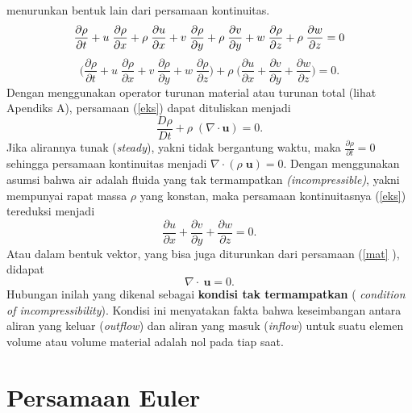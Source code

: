 \documentclass[12pt,a4paper]{report}
\begin{document}
menurunkan bentuk lain dari persamaan kontinuitas.
\begin{equation}
\frac{\partial \rho}{\partial t}+u\;\frac{\partial \rho}{\partial x}+\rho\;%
\frac{\partial u}{\partial x}+v\;\frac{\partial \rho}{\partial y}+\rho\;%
\frac{\partial v}{\partial y}+w\;\frac{\partial \rho}{\partial z}+\rho\;%
\frac{\partial w}{\partial z}=0 \\
\end{equation}
\begin{equation}
\Bigg(\frac{\partial \rho}{\partial t}+u\;\frac{\partial \rho}{\partial x}%
+v\;\frac{\partial \rho}{\partial y}+w\;\frac{\partial \rho}{\partial z}%
\Bigg)+\rho\;\Bigg(\frac{\partial u}{\partial x}+\frac{\partial v}{\partial y%
}+\frac{\partial w}{\partial z}\Bigg)=0.  \label{eks}
\end{equation}
Dengan menggunakan operator turunan material atau turunan total (lihat
Apendiks A), persamaan (\ref{eks}) dapat dituliskan menjadi
\begin{equation}
\frac{D\rho}{Dt}+\rho\;(\nabla \cdot\mathbf{u}) = 0.  \label{mat}
\end{equation}
Jika alirannya tunak (\textit{steady}), yakni tidak bergantung waktu, maka $%
\displaystyle \frac{\partial \rho}{\partial t}=0$ sehingga persamaan
kontinuitas menjadi $\nabla \cdot(\rho\;\mathbf{u}) = 0.$ Dengan menggunakan
asumsi bahwa air adalah fluida yang tak termampatkan {\itshape%
(incompressible)}, yakni mempunyai rapat massa $\rho$ yang konstan, maka
persamaan kontinuitasnya (\ref{eks}) tereduksi menjadi
\begin{equation}
\frac{\partial u}{\partial x}+\frac{\partial v}{\partial y}+\frac{\partial w%
}{\partial z}=0.
\end{equation}
Atau dalam bentuk vektor, yang bisa juga diturunkan dari persamaan (\ref{mat}%
), didapat
\begin{equation}
\nabla\cdot\ \mathbf{u}=0.  \label{vpk}
\end{equation}
Hubungan inilah yang dikenal sebagai \textbf{kondisi tak termampatkan} (%
\textit{condition of incompressibility}). Kondisi ini menyatakan fakta bahwa
keseimbangan antara aliran yang keluar (\textit{outflow}) dan aliran yang
masuk (\textit{inflow}) untuk suatu elemen volume atau volume material
adalah nol pada tiap saat.

\section{Persamaan Euler}
\end{document}

